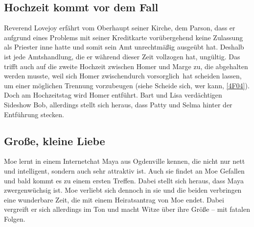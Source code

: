 \subsection{Hochzeit kommt vor dem Fall}\label{LABF05}
Reverend Lovejoy erfährt vom Oberhaupt seiner Kirche, dem Parson, dass er aufgrund eines Problems mit seiner Kreditkarte vorübergehend keine Zulassung als Priester inne hatte und somit sein Amt unrechtmäßig ausgeübt hat. Deshalb ist jede Amtshandlung, die er während dieser Zeit vollzogen hat, ungültig. Das trifft auch auf die zweite Hochzeit zwischen Homer und Marge zu, die abgehalten werden musste, weil sich Homer zwischendurch \glqq vorsorglich\grqq\ hat scheiden lassen, um einer möglichen Trennung vorzubeugen (siehe \glqq Scheide sich, wer kann\grqq , \ref{4F04}). Doch am Hochzeitstag wird Homer entführt. Bart und Lisa verdächtigen Sideshow Bob, allerdings stellt sich heraus, dass Patty und Selma hinter der Entführung stecken.


\subsection{Große, kleine Liebe}\label{LABF06}
Moe lernt in einem Internetchat Maya aus Ogdenville kennen, die nicht nur nett und intelligent, sondern auch sehr attraktiv ist. Auch sie findet an Moe Gefallen und bald kommt es zu einem ersten Treffen. Dabei stellt sich heraus, dass Maya zwergenwüchsig ist. Moe verliebt sich dennoch in sie und die beiden verbringen eine wunderbare Zeit, die mit einem Heiratsantrag von Moe endet. Dabei vergreift er sich allerdings im Ton und macht Witze über ihre Größe -- mit fatalen Folgen. 


